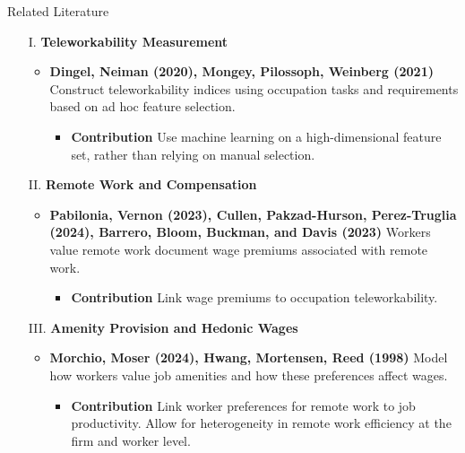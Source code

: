 \documentclass[aspectratio=1610]{beamer}
\begin{document}
\begin{frame}{Related Literature}
    \begin{itemize}
        \item[I.] \textbf{Teleworkability Measurement} 
        \begin{itemize}
            \item \textbf{Dingel, Neiman (2020), Mongey, Pilossoph, Weinberg (2021)} Construct teleworkability indices using occupation tasks and requirements based on ad hoc feature selection.
            \begin{itemize}
                \item \textbf{Contribution} Use machine learning on a high-dimensional feature set, rather than relying on manual selection.
            \end{itemize}
        \end{itemize}
        \vspace{0.3cm}
        
        \item[II.] \textbf{Remote Work and Compensation}
        \begin{itemize}
            \item \textbf{Pabilonia, Vernon (2023), Cullen, Pakzad-Hurson, Perez-Truglia (2024), Barrero, Bloom, Buckman, and Davis (2023)} Workers value remote work document wage premiums associated with remote work.
            \begin{itemize}
                \item \textbf{Contribution} Link wage premiums to occupation teleworkability.
            \end{itemize}
        \end{itemize}

        \vspace{0.3cm}
        \item[III.] \textbf{Amenity Provision and Hedonic Wages}
        \begin{itemize}
            \item \textbf{Morchio, Moser (2024), Hwang, Mortensen, Reed (1998)} Model how workers value job amenities and how these preferences affect wages. 
            \begin{itemize}
                \item \textbf{Contribution} Link worker preferences for remote work to job productivity. Allow for heterogeneity in remote work efficiency at the firm and worker level.
            \end{itemize}
        \end{itemize}
    \end{itemize}
\end{frame}
\end{document}

